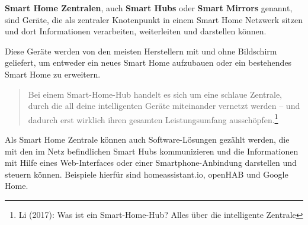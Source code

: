 	\textbf{Smart Home Zentralen}, auch \textbf{Smart Hubs} oder \textbf{Smart Mirrors} genannt, sind Geräte, die als zentraler Knotenpunkt in einem Smart Home Netzwerk sitzen und dort Informationen verarbeiten, weiterleiten und darstellen können.\par
 	Diese Geräte werden von den meisten Herstellern mit und ohne Bildschirm geliefert, um entweder ein neues Smart Home aufzubauen oder ein bestehendes Smart Home zu erweitern. 
 	\begin{quote}
 		\color{quotetext}
 		Bei einem Smart-Home-Hub handelt es sich um eine schlaue Zentrale, durch die all deine intelligenten Geräte miteinander vernetzt werden – und dadurch erst wirklich ihren gesamten Leistungsumfang ausschöpfen.\footnote{Li (2017): Was ist ein Smart-Home-Hub? Alles über die intelligente Zentrale}
 	\end{quote}
Als Smart Home Zentrale können auch Software-Lösungen gezählt werden, die mit den im Netz befindlichen Smart Hubs kommunizieren und die Informationen mit Hilfe eines Web-Interfaces oder einer Smartphone-Anbindung darstellen und steuern können. Beispiele hierfür sind homeassistant.io, openHAB und Google Home.\par

